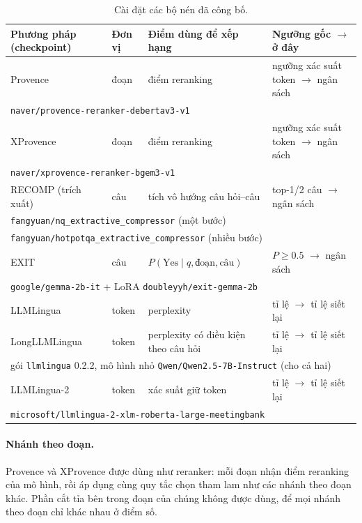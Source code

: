 \documentclass[11pt]{article}
\begin{document}
\begin{table}[t]
\centering
\small
\setlength{\tabcolsep}{4pt}
\begin{tabular}{llll}
\toprule
\textbf{Phương pháp (checkpoint)} & \textbf{Đơn vị} & \textbf{Điểm dùng để xếp hạng} & \textbf{Ngưỡng gốc $\to$ ở đây} \\
\midrule
Provence & đoạn & điểm reranking & ngưỡng xác suất token $\to$ ngân sách \\
\multicolumn{4}{l}{\quad\texttt{naver/provence-reranker-debertav3-v1}} \\
XProvence & đoạn & điểm reranking & ngưỡng xác suất token $\to$ ngân sách \\
\multicolumn{4}{l}{\quad\texttt{naver/xprovence-reranker-bgem3-v1}} \\
RECOMP (trích xuất) & câu & tích vô hướng câu hỏi--câu & top-1/2 câu $\to$ ngân sách \\
\multicolumn{4}{l}{\quad\texttt{fangyuan/nq\_extractive\_compressor} (một bước)} \\
\multicolumn{4}{l}{\quad\texttt{fangyuan/hotpotqa\_extractive\_compressor} (nhiều bước)} \\
EXIT & câu & $P(\text{Yes}\mid q,\text{đoạn},\text{câu})$ & $P\ge0.5$ $\to$ ngân sách \\
\multicolumn{4}{l}{\quad\texttt{google/gemma-2b-it} + LoRA \texttt{doubleyyh/exit-gemma-2b}} \\
LLMLingua & token & perplexity & tỉ lệ $\to$ tỉ lệ siết lại \\
LongLLMLingua & token & perplexity có điều kiện theo câu hỏi & tỉ lệ $\to$ tỉ lệ siết lại \\
\multicolumn{4}{l}{\quad gói \texttt{llmlingua} 0.2.2, mô hình nhỏ \texttt{Qwen/Qwen2.5-7B-Instruct} (cho cả hai)} \\
LLMLingua-2 & token & xác suất giữ token & tỉ lệ $\to$ tỉ lệ siết lại \\
\multicolumn{4}{l}{\quad\texttt{microsoft/llmlingua-2-xlm-roberta-large-meetingbank}} \\
\bottomrule
\end{tabular}
\caption{Cài đặt các bộ nén đã công bố.}
\label{tab:baselines}
\end{table}

\paragraph{Nhánh theo đoạn.} Provence và XProvence được dùng như reranker: mỗi đoạn nhận điểm
reranking của mô hình, rồi áp dụng cùng quy tắc chọn tham lam như các nhánh theo đoạn khác. Phần
cắt tỉa bên trong đoạn của chúng không được dùng, để mọi nhánh theo đoạn chỉ khác nhau ở điểm số.
\end{document}
